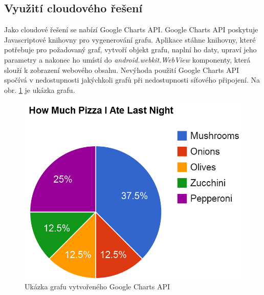 \documentclass{diplomka}
\begin{document}
\subsection{Využití cloudového řešení}
Jako cloudové řešení se nabízí Google Charts API\cite{googlecharts}. Google Charts API poskytuje Javascriptové knihovny pro vygenerování grafu. Aplikace stáhne knihovny, které potřebuje pro požadovaný graf, vytvoří objekt grafu, naplní ho daty, upraví jeho parametry a nakonec ho umístí do \emph{android.webkit.WebView} komponenty, která slouží k zobrazení webového obsahu. Nevýhoda použití Google Charts API spočívá v nedostupnosti jakýchkoli grafů při nedostupnosti síťového připojení. Na obr. \ref{fig:gcharts} je ukázka grafu.
\begin{figure}[H]
  \centering
  \includegraphics[scale=0.5]{obr/gcharts.png}
\caption{Ukázka grafu vytvořeného Google Charts API}
\label{fig:gcharts}
\end{figure}
\end{document}
